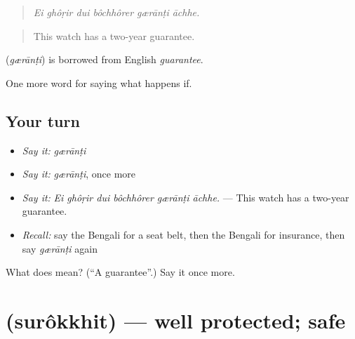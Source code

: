 \begin{quote}
     
\end{quote}

\begin{quote}
\emph{Ei ghôṛir dui bôchhôrer gærānṭi āchhe.}
\end{quote}

\begin{quote}
This watch has a two-year guarantee.
\end{quote}

\begin{cousinweb}
\textbf{} (\emph{gærānṭi}) is borrowed from English \emph{guarantee}.
\end{cousinweb}

\begin{grammarlens}[title={What you've built}]
One more word for saying what happens if.
\end{grammarlens}

\subsection*{Your turn}
\begin{itemize}
\raggedright
  \item \emph{Say it:} \emph{gærānṭi}
  \item \emph{Say it:} \emph{gærānṭi}, once more
  \item \emph{Say it:} \emph{Ei ghôṛir dui bôchhôrer gærānṭi āchhe.} — This watch has a two-year guarantee.
  \item \emph{Recall:} say the Bengali for a seat belt, then the Bengali for insurance, then say \emph{gærānṭi} again
\end{itemize}

\begin{tcolorbox}[breakable,colback=teal!4,colframe=teal!35!black,title={Before you move on}]
What does  mean? (\textquotedblleft{}A guarantee\textquotedblright{}.) Say it once more.
\end{tcolorbox}
\section[\texorpdfstring{\bn{সুরক্ষিত} (surôkkhit)}{সুরক্ষিত (surôkkhit)}]{ (surôkkhit) — well protected; safe}

\label{lesson:BN-C535-surokkhit}



